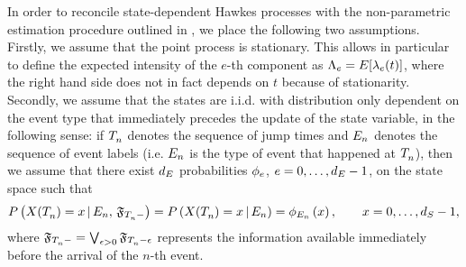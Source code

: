 \documentclass[10pt, article,table]{article}
\begin{document}
In order to reconcile state-dependent Hawkes processes with the non-parametric estimation procedure outlined in \citealp{BM16fir}, we place the following two assumptions. Firstly, we assume that the point process is stationary. This allows in particular to define the expected intensity of the $e$-th component as $\Lambda_e = \Expectation[\intensity(t)]$, where the right hand side does not in fact depends on $t$ because of stationarity. Secondly, we assume that the states are i.i.d. with distribution only dependent on the event type that immediately precedes the update of the state variable, in the following sense: if $\arrivalTimes[]_n$ denotes the sequence of jump times and $\event[n]$ denotes the sequence of event labels (i.e. $\event$ is the type of event that happened at $\arrivalTimes[]_n$), then we assume that
there exist $\numEventTypes$ probabilities $\transProb_e$, $e=0,\dots,\numEventTypes - 1$,  on the state space such that 
 \begin{equation*}
   \Prob\left( \stateVariable(\arrivalTimes[ ]_{n})=x \,  \vert \,  E_n, \, \internalHistory_{\arrivalTimes[ ]_{n}-} \right)
   =
   \Prob\left( \stateVariable(\arrivalTimes[ ]_{n})=x \,  \vert \,  E_n\right)
   =
   \transProb_{E_n}\left(x\right),
   \qquad
   x=0, \dots, \numStates-1,
\end{equation*}
where $\internalHistory_{\arrivalTimes[ ]_{n}-} = \bigvee_{\epsilon>0} \internalHistory_{\arrivalTimes[ ]_{n} - \epsilon}$ represents the information available immediately before the arrival of the $n$-th event.
\end{document}
